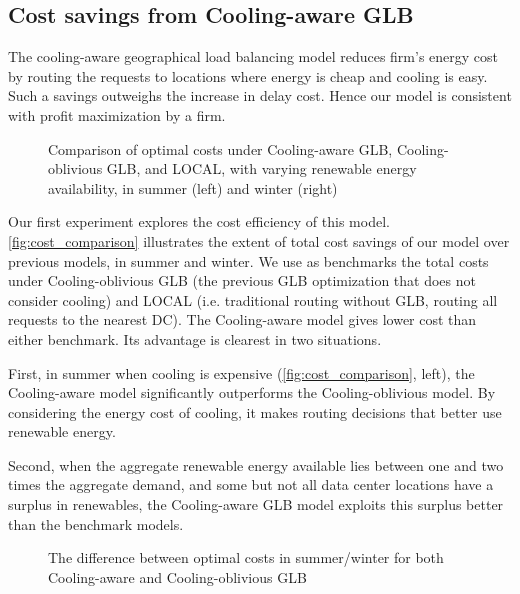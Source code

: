 \documentclass{acm_proc_article-sp}
\begin{document}
\subsection{Cost savings from Cooling-aware GLB}

The cooling-aware geographical load balancing model reduces firm’s energy cost by routing the requests to locations where energy is cheap and cooling is easy. Such a savings outweighs the increase in delay cost. Hence our model is consistent with profit maximization by a firm.


\begin{figure*}
\centering
{}
\caption{Comparison of optimal costs under Cooling-aware GLB, Cooling-oblivious GLB, and LOCAL, with varying renewable energy availability, in summer (left) and winter (right)}
\label{fig:cost_comparison}
\end{figure*}

Our first experiment explores the cost efficiency of this model. \autoref{fig:cost_comparison} illustrates the extent of total cost savings of our model over previous models, in summer and winter. We use as benchmarks the total costs under Cooling-oblivious GLB (the previous GLB optimization that does not consider cooling) and LOCAL (i.e. traditional routing without GLB, routing all requests to the nearest DC). The Cooling-aware model gives lower cost than either benchmark. Its advantage is clearest in two situations.

First, in summer when cooling is expensive (\autoref{fig:cost_comparison}, left), the Cooling-aware model significantly outperforms the Cooling-oblivious model. By considering the energy cost of cooling, it makes routing decisions that better use renewable energy.

Second, when the aggregate renewable energy available lies between one and two times the aggregate demand, and some but not all data center locations have a surplus in renewables, the Cooling-aware GLB model exploits this surplus better than the benchmark models.

\begin{figure}
\centering
{}
\caption{The difference between optimal costs in summer/winter for both Cooling-aware and Cooling-oblivious GLB}
\label{fig:cost_diff}
\end{figure}
\end{document}
